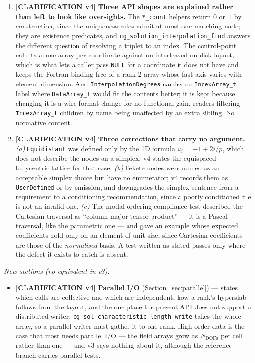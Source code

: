 \documentclass[11pt,letterpaper]{article}
\newif\ifvfourdraft
\newenvironment{v4block}{\ifvfourdraft\color{v4violet}\fi\ignorespaces}{\par}
\newcommand{\CLARIFYIV}{\ifvfourdraft
  \textcolor{v4violet}{\textbf{[CLARIFICATION v4]}}\else
  \textcolor{clarifybrown}{\textbf{[CLARIFICATION v4]}}\fi}
\begin{document}
{\begin{v4block}
\begin{enumerate}[leftmargin=1.4em,itemsep=0.5em]
  \item \CLARIFYIV{} \textbf{Three API shapes are explained rather than left to
    look like oversights.}  The \texttt{*\_count} helpers return $0$ or~$1$ by
    construction, since the uniqueness rules admit at most one matching node; they
    are existence predicates, and \texttt{cg\_solution\_interpolation\_find}
    answers the different question of resolving a triplet to an index.  The
    control-point calls take one array per coordinate against an interleaved
    on-disk layout, which is what lets a caller pass \texttt{NULL} for a
    coordinate it does not have and keeps the Fortran binding free of a rank-2
    array whose fast axis varies with element dimension.  And
    \texttt{InterpolationDegrees} carries an \texttt{IndexArray\_t} label where
    \texttt{DataArray\_t} would fit the contents better; it is kept because
    changing it is a wire-format change for no functional gain, readers filtering
    \texttt{IndexArray\_t} children by name being unaffected by an extra sibling.
    No normative content.

  \item \CLARIFYIV{} \textbf{Three corrections that carry no argument.}
    \emph{(a)} \texttt{Equidistant} was defined only by the 1D formula
    $u_i = -1+2i/p$, which does not describe the nodes on a simplex; v4 states the
    equispaced barycentric lattice for that case.  \emph{(b)} Fekete nodes were
    named as an acceptable simplex choice but have no enumerator; v4 records them
    as \texttt{UserDefined} or by omission, and downgrades the simplex sentence
    from a requirement to a conditioning recommendation, since a poorly
    conditioned file is not an invalid one.  \emph{(c)} The modal-ordering
    compliance test described the Cartesian traversal as ``column-major tensor
    product'' --- it is a Pascal traversal, like the parametric one --- and gave an
    example whose expected coefficients hold only on an element of unit size,
    since Cartesian coefficients are those of the \emph{normalised} basis.  A test
    written as stated passes only where the defect it exists to catch is absent.

\end{enumerate}

\medskip
\noindent\textit{New sections (no equivalent in v3):}
\begin{itemize}[nosep,leftmargin=1.5em]
  \item \CLARIFYIV{} \textbf{Parallel I/O} (Section~\ref{sec:parallel}) --- states
    which calls are collective and which are independent, how a rank's hyperslab
    follows from the layout, and the one place the present API does not support a
    distributed writer: \texttt{cg\_sol\_characteristic\_length\_write} takes the
    whole array, so a parallel writer must gather it to one rank.  High-order data
    is the case that most needs parallel I/O --- the field arrays grow as
    $N_\mathrm{DOFs}$ per cell rather than one --- and v3 says nothing about it,
    although the reference branch carries parallel tests.


\end{itemize}
\end{v4block}}
\end{document}
